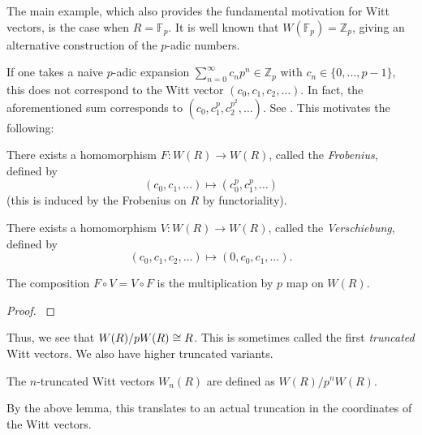 The main example, which also provides the fundamental motivation
for Witt vectors, is the case when \(R = \mathbb{F}_{p}\).
It is well known that \(W(\mathbb{F}_{p}) = \mathbb{Z}_{p}\), 
giving an alternative construction of the \(p\)-adic numbers.

\begin{warn}
	If one takes a
    naive \(p\)-adic expansion 
    \(\sum_{n = 0}^{\infty} c_{n}p^{n} \in \mathbb{Z}_{p}\)
    with \(c_{n} \in \{0, \ldots, p-1\}\), this does not correspond
    to the Witt vector \((c_{0}, c_{1}, c_{2}, \ldots)\).
    In fact, the aforementioned sum corresponds to 
    \((c_{0}, c_{1}^{p}, c_{2}^{p^{2}}, \ldots)\). See
	\cite[Section~2]{kim-2017-witt-vec}. 
    This motivates the following: 
\end{warn}


\begin{defn}
	There exists a homomorphism \(F \colon W(R) \xrightarrow{} W(R)\),
	called the \textit{Frobenius},
	defined by
	\[
	 (c_{0}, c_{1}, \ldots) \mapsto (c_{0}^{p}, c_{1}^{p}, \ldots)
	\] 
    (this is induced by the Frobenius on \(R\) by functoriality).
\end{defn}

\begin{defn}
	There exists a homomorphism \(V \colon W(R) \xrightarrow{} W(R)\),
	called the \textit{Verschiebung},
	defined by
	\[
		(c_{0}, c_{1}, c_{2}, \ldots) \mapsto  (0, c_{0}, c_{1}, \ldots)
	.\] 
\end{defn}

\begin{lem}
	The composition \(F \circ V = V \circ F\) is the multiplication by
	\(p\) map on \(W(R)\).
\end{lem}

\begin{proof}
	\cite[Proposition~5]{kim-2017-witt-vec}
\end{proof}

Thus, we see that \(W(R) / pW(R) \cong R\).
This is sometimes called the first \textit{truncated}
Witt vectors.
We also have higher truncated variants.

\begin{defn}
	The \(n\)-truncated Witt vectors
	\(W_{n}(R)\) are defined as
	\(W(R) / p^{n}W(R)\).
\end{defn}

By the above lemma, this translates to an actual truncation
in the coordinates of the Witt vectors.

